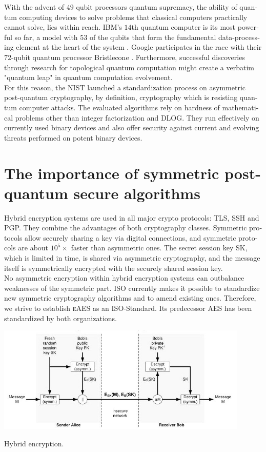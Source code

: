 \documentclass[a4paper,11pt]{article}
\begin{document}
\begin{otherlanguage}{english}
\noindent
With the advent of $49$ qubit processors quantum supremacy, the ability of quantum computing devices to solve problems that classical computers practically cannot solve,  lies within reach. IBM's $14$th quantum computer is its most powerful so far, a model with $53$ of the qubits that form the fundamental data-processing element at the heart of the system \cite{MSN}. Google participates in the race with their $72$-qubit quantum processor Bristlecone \cite{googleai}.  Furthermore, successful discoveries through research for topological quantum computation \cite{TQB} might create a verbatim "quantum leap" in quantum computation evolvement. \\

\noindent
For this reason, the NIST launched a standardization process on asymmetric post-quantum cryptography, by definition, cryptography which is resisting quantum computer attacks. The evaluated algorithms rely on hardness of mathematical problems other than integer factorization and DLOG. They run effectively on currently used binary devices and also offer security against current and evolving threats performed on potent binary devices.\\


\section{The importance of symmetric post-quantum secure algorithms}

\noindent
Hybrid encryption systems are used in all major crypto protocols: TLS, SSH and PGP. They combine the advantages of both cryptography classes. Symmetric protocols allow securely sharing a key via digital connections, and symmetric protocols are about $10^5 \times$ faster than asymmetric ones. The secret session key SK, which is limited in time, is shared via asymmetric cryptography, and the message itself is symmetrically encrypted with the securely shared session key.\\

\noindent
No asymmetric encryption within hybrid encryption systems can outbalance weaknesses of the symmetric part. ISO currently makes it possible to standardize new symmetric cryptography algorithms and to amend existing ones. Therefore, we strive to establish \textsc{eAES} as an ISO-Standard. Its predecessor \textsc{AES} has been standardized by both organizations. \\

\begin{figurehere}
  \centering
  \includegraphics[width=12cm]{hybrid-encryption.jpg}
  \caption{Hybrid encryption.\label{abb_1}}
\end{figurehere}


\end{otherlanguage}
\end{document}
